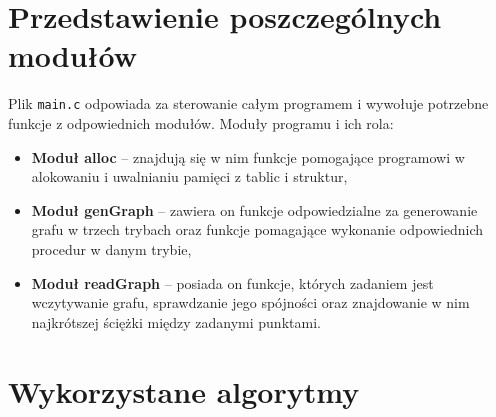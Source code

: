 \documentclass[10pt, a4paper]{report}
\begin{document}
    \section{Przedstawienie poszczególnych modułów}
    Plik \texttt{main.c} odpowiada za sterowanie całym programem i wywołuje potrzebne funkcje z odpowiednich modułów.
    Moduły programu i ich rola:
    \begin{itemize}
        \item \textbf{Moduł alloc} -- znajdują się w nim funkcje pomogające programowi w alokowaniu i uwalnianiu pamięci z tablic i struktur,
        \item \textbf{Moduł genGraph} -- zawiera on funkcje odpowiedzialne za generowanie grafu w trzech trybach oraz funkcje pomagające wykonanie odpowiednich procedur w danym trybie,
        \item \textbf{Moduł readGraph} -- posiada on funkcje, których zadaniem jest wczytywanie grafu, sprawdzanie jego spójności oraz znajdowanie w nim najkrótszej ściężki między zadanymi punktami.
    \end{itemize}

    \section{Wykorzystane algorytmy}
\end{document}
